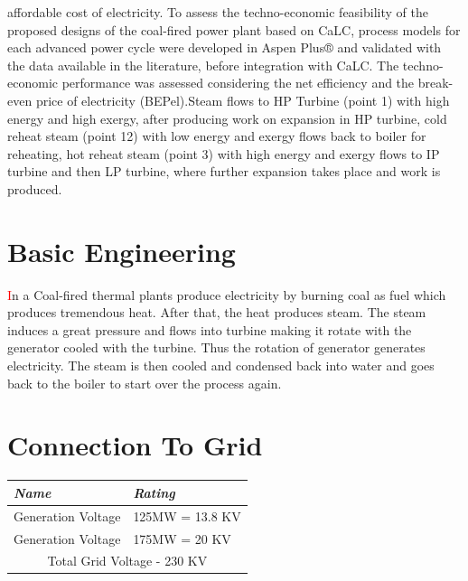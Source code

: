 \documentclass[11 pt]{article}
\begin{document}
affordable cost of electricity. To assess the techno-economic feasibility of the proposed designs of the coal-fired power plant based on CaLC, process models for each advanced power cycle were developed in Aspen Plus® and validated with the data available in the literature, before integration with CaLC. The techno-economic performance was assessed considering the net efficiency and the break-even price of electricity (BEPel).Steam flows to HP Turbine (point 1) with high energy and high exergy, after producing work on expansion in HP turbine, cold reheat steam (point 12) with low energy and exergy flows back to boiler for reheating, hot reheat steam (point 3) with high energy and exergy flows to IP turbine and then LP turbine, where further expansion takes place and work is produced.

\section{Basic Engineering}
{\huge\textcolor{red}{\hspace{5 mm}I}}n a Coal-fired thermal plants produce electricity by burning coal as fuel which produces tremendous heat. After that, the heat produces steam. The steam induces a great pressure and flows into turbine  making it rotate with the generator cooled with the turbine. Thus the rotation of generator generates electricity. The steam is then cooled and condensed back into water and goes back to the boiler to start over the process again.

\pagebreak

\section{Connection To Grid}
	\begin{longtable}{|| m{10 em} | m{10 em} ||}
		\hline\hline
		\rowcolor{teal!20}
			\hline
			\rowcolor{green!70}
			\textbf{\textit{Name}} & \textbf{\textit{Rating}}\\
			\hline\hline
			Generation Voltage & 125MW = 13.8 KV\\
			\hline
			Generation Voltage & 175MW = 20 KV\\
			\hline
			\multicolumn{2}{c}{Total Grid Voltage - 230 KV}\\
			\hline\hline
	\end{longtable}
\end{document}
